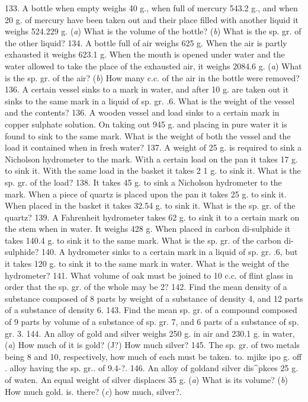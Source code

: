 133. A bottle when empty weighs 40 g., when full of mercury 543.2 g., and when 20 g. of mercury have been taken out and their place filled with another liquid it weighs 524.229 g. (\emph{a}) What is the volume of the bottle? (\emph{b}) What is the sp. gr. of the other liquid?
134. A bottle full of air weighs 625 g. When the air is partly exhausted it weighs 623.1 g. When the mouth is opened under water and the water allowed to take the place of the exhausted air, it weighs 2084.6 g. (\emph{a}) What is the sp. gr. of the air? (\emph{b}) How many c.c. of the air in the bottle were removed?
136. A certain vessel sinks to a mark in water, and after 10 g. are taken out it sinks to the same mark in a liquid of sp. gr. .6. What is the weight of the vessel and the contents?
136. A wooden vessel and load sinks to a certain mark in copper sulphate solution. On taking out 945 g. and placing in pure water it is found to sink to the same mark. What is the weight of both the vessel and the load it contained when in fresh water?
137. A weight of 25 g. is required to sink a Nicholson hydrometer to the mark. With a certain load on the pan it takes 17 g. to sink it. With the same load in the basket it takes 2 1 g. to sink it. What is the sp. gr. of the load?
138. It takes 45 g. to sink a Nicholson hydrometer to the mark. When a piece of quartz is placed upon the pan it takes 25 g. to sink it. When placed in the basket it takes 32.54 g. to sink it. What is the sp. gr. of the quartz?
139. A Fahrenheit hydrometer takes 62 g. to sink it to a certain mark on the stem when in water. It weighs 428 g. When placed in carbon di-sulphide it takes 140.4 g. to sink it to the same mark. What is the sp. gr. of the carbon di-sulphide?
140. A hydrometer sinks to a certain mark in a liquid of sp. gr. .6, but it takes 120 g. to sink it to the same mark in water. What is the weight of the hydrometer?
141. What volume of oak must be joined to 10 c.c. of flint glass in order that the sp. gr. of the whole may be 2?
142. Find the mean density of a substance composed of 8 parts by weight of a substance of density 4, and 12 parts of a substance of density 6.
143. Find the mean sp. gr. of a compound composed of 9 parts by volume of a substance of sp. gr. 7, and 6 parts of a substance of sp. gr. 3.
144. An alloy of gold and silver weighs 250 g. in air and 230.1 g. in water, (\emph{a}) How much of it is gold? (J?) How much silver?
145. The sp. gr. of two metals being 8 and 10, respectively, how much of each must be taken. to. mjike ipo g. off . alloy having the sp. gr.. of 9.4-?.
146. An alloy of goldand silver dis^pkces 25 g. of waten. An equal weight of silver displaces 35 g. (\emph{a}) What is its volume? (\emph{b}) How much gold. is. there? (\emph{c}) how much, silver?.
